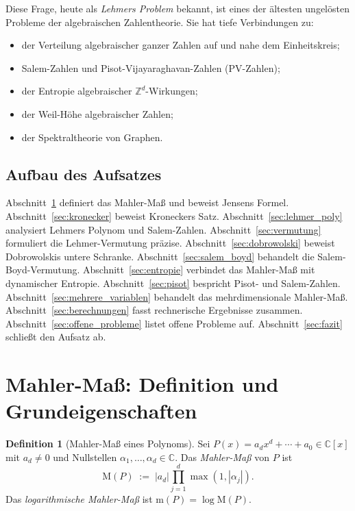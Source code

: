 \documentclass[12pt,a4paper]{amsart}
\theoremstyle{definition}
\newtheorem{definition_de}[theorem]{Definition}
\theoremstyle{remark}
\newcommand{\Z}{\mathbb{Z}}
\newcommand{\C}{\mathbb{C}}
\newcommand{\M}{\mathrm{M}}
\newcommand{\m}{\mathrm{m}}
\begin{document}
Diese Frage, heute als \emph{Lehmers Problem} bekannt, ist eines der ältesten ungelösten
Probleme der algebraischen Zahlentheorie. Sie hat tiefe Verbindungen zu:
\begin{itemize}
  \item der Verteilung algebraischer ganzer Zahlen auf und nahe dem Einheitskreis;
  \item Salem-Zahlen und Pisot-Vijayaraghavan-Zahlen (PV-Zahlen);
  \item der Entropie algebraischer $\Z^d$-Wirkungen;
  \item der Weil-Höhe algebraischer Zahlen;
  \item der Spektraltheorie von Graphen.
\end{itemize}

\subsection{Aufbau des Aufsatzes}
Abschnitt~\ref{sec:mahler_def} definiert das Mahler-Maß und beweist Jensens Formel.
Abschnitt~\ref{sec:kronecker} beweist Kroneckers Satz.
Abschnitt~\ref{sec:lehmer_poly} analysiert Lehmers Polynom und Salem-Zahlen.
Abschnitt~\ref{sec:vermutung} formuliert die Lehmer-Vermutung präzise.
Abschnitt~\ref{sec:dobrowolski} beweist Dobrowolskis untere Schranke.
Abschnitt~\ref{sec:salem_boyd} behandelt die Salem-Boyd-Vermutung.
Abschnitt~\ref{sec:entropie} verbindet das Mahler-Maß mit dynamischer Entropie.
Abschnitt~\ref{sec:pisot} bespricht Pisot- und Salem-Zahlen.
Abschnitt~\ref{sec:mehrere_variablen} behandelt das mehrdimensionale Mahler-Maß.
Abschnitt~\ref{sec:berechnungen} fasst rechnerische Ergebnisse zusammen.
Abschnitt~\ref{sec:offene_probleme} listet offene Probleme auf.
Abschnitt~\ref{sec:fazit} schließt den Aufsatz ab.

\section{Mahler-Maß: Definition und Grundeigenschaften}\label{sec:mahler_def}

\begin{definition_de}[Mahler-Maß eines Polynoms]
  Sei $P(x) = a_d x^d + \cdots + a_0 \in \C[x]$ mit $a_d \neq 0$ und Nullstellen
  $\alpha_1,\ldots,\alpha_d \in \C$. Das \emph{Mahler-Maß} von $P$ ist
  \[
    \M(P) \;:=\; |a_d| \prod_{j=1}^d \max(1, |\alpha_j|).
  \]
  Das \emph{logarithmische Mahler-Maß} ist $\m(P) = \log \M(P)$.
\end{definition_de}
\end{document}
